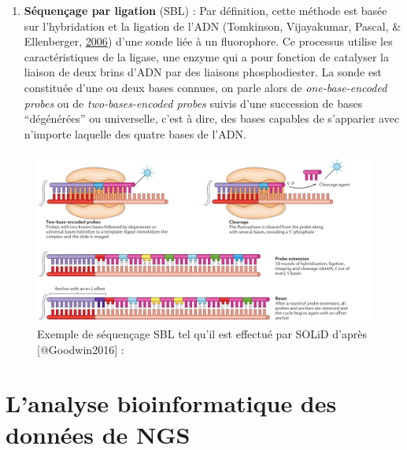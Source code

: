 \documentclass[12pt,twoside]{reedthesis}
\providecommand{\tightlist}{%
  \setlength{\itemsep}{0pt}\setlength{\parskip}{0pt}}
\theoremstyle{definition}
\theoremstyle{definition}
\theoremstyle{remark}
\begin{document}
  \begin{enumerate}
  \def\labelenumi{\arabic{enumi}.}
  \setcounter{enumi}{1}
  \tightlist
  \item
    \textbf{Séquençage par ligation} (SBL) : Par définition, cette méthode
    est basée sur l'hybridation et la ligation de l'ADN (Tomkinson,
    Vijayakumar, Pascal, \& Ellenberger,
    \protect\hyperlink{ref-Tomkinson2006}{2006}) d'une sonde liée à un
    fluorophore. Ce processus utilise les caractéristiques de la ligase,
    une enzyme qui a pour fonction de catalyser la liaison de deux brins
    d'ADN par des liaisons phosphodiester. La sonde est constituée d'une
    ou deux bases connues, on parle alors de \emph{one-base-encoded
    probes} ou de \emph{two-bases-encoded probes} suivis d'une succession
    de bases ``dégénérées'' ou universelle, c'est à dire, des bases
    capables de s'apparier avec n'importe laquelle des quatre bases de
    l'ADN.
  \end{enumerate}
  
  \begin{figure}
  
  {\centering \includegraphics[scale=.26]{figure/SBL_seq_solid} 
  
  }
  
  \caption[Exemple de séquençage SBL tel qu'il est effectué par SOLiD]{Exemple de séquençage SBL tel qu'il est effectué par SOLiD d'après [@Goodwin2016] : }\label{fig:sblSeq}
  \end{figure}
  
  \newpage  
  
  \section{L'analyse bioinformatique des données de
  NGS}\label{lanalyse-bioinformatique-des-donnees-de-ngs}
  
\end{document}
